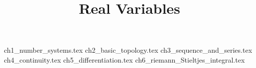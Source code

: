 \documentclass[]{report}
\title{Real Variables}
\begin{document}
\maketitle
{ch1_number_systems.tex}
{ch2_basic_topology.tex}
{ch3_sequence_and_series.tex}
{ch4_continuity.tex}
{ch5_differentiation.tex}
{ch6_riemann_Stieltjes_integral.tex}
\end{document}
